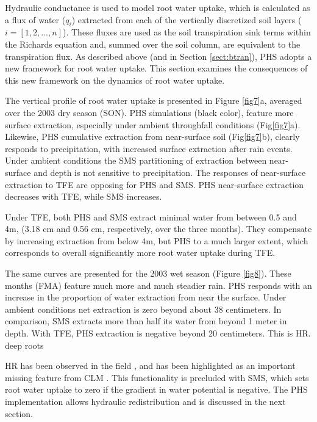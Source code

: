 \documentclass[draft,linenumbers]{agujournal}
\begin{document}
Hydraulic conductance is used to model root water uptake, which is calculated as a flux of water ($q_i$) 
extracted from each of the vertically discretized soil layers ($i=\left[1,2,...,n\right]$).
These fluxes are used as the soil transpiration sink terms within the Richards equation and, summed over the soil column, are equivalent to the transpiration flux.
As described above (and in Section \ref{sect:btran}), PHS adopts a new framework for root water uptake. 
This section examines the consequences of this new framework on the dynamics of root water uptake.

The vertical profile of root water uptake is presented in Figure \ref{fig7}a, averaged over the 2003 dry season (SON). 
PHS simulations (black color), feature more surface extraction, especially under ambient throughfall conditions (Fig\ref{fig7}a).
Likewise, PHS cumulative extraction from near-surface soil (Fig\ref{fig7}b), clearly responds to precipitation, with increased surface extraction after rain events.
Under ambient conditions the SMS partitioning of extraction between near-surface and depth is not sensitive to precipitation.
The responses of near-surface extraction to TFE are opposing for PHS and SMS.
PHS near-surface extraction decreases with TFE, while SMS increases.

Under TFE, both PHS and SMS extract minimal water from between 0.5 and 4m, (3.18 cm and 0.56 cm, respectively, over the three months).
They compensate by increasing extraction from below 4m, but PHS to a much larger extent, which corresponds to overall significantly more root water uptake during TFE.

The same curves are presented for the 2003 wet season (Figure \ref{fig8}).
These months (FMA) feature much more and much steadier rain.
PHS responds with an increase in the proportion of water extraction from near the surface.
Under ambient conditions net extraction is zero beyond about 38 centimeters.
In comparison, SMS extracts more than half its water from beyond 1 meter in depth.
With TFE, PHS extraction is negative beyond 20 centimeters.
This is HR.
deep roots \citep{nepstad1994}

HR has been observed in the field \citep{oliveira2005}, and has been highlighted as an important missing feature from CLM \citep{lee2005}.
This functionality is precluded with SMS, which sets root water uptake to zero if the gradient in water potential is negative. 
The PHS implementation allows hydraulic redistribution and is discussed in the next section.
\end{document}

